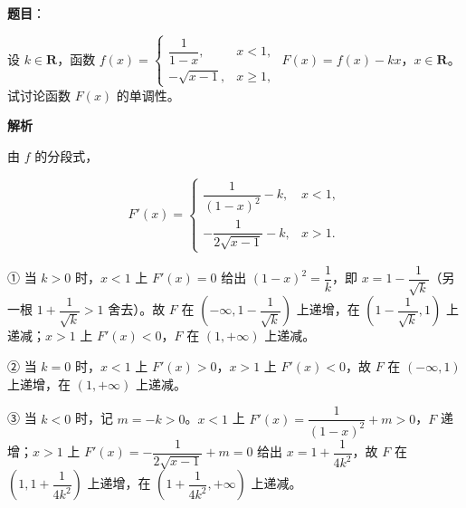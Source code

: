 \begin{answer}

\textbf{题目}：

设 $k\in\mathbf R$，函数 $f(x)=\begin{cases}\dfrac1{1-x},&x<1,\\ -\sqrt{x-1},&x\geqslant1,\end{cases}$ $F(x)=f(x)-kx$，$x\in\mathbf R$。试讨论函数 $F(x)$ 的单调性。

\textbf{解析}

由 $f$ 的分段式，

\nopagebreak[4]
\[F'(x)=\begin{cases}\dfrac1{(1-x)^2}-k,&x<1,\\[6pt] -\dfrac1{2\sqrt{x-1}}-k,&x>1.\end{cases}\]

① 当 $k>0$ 时，$x<1$ 上 $F'(x)=0$ 给出 $(1-x)^2=\dfrac1k$，即 $x=1-\dfrac1{\sqrt k}$（另一根 $1+\dfrac1{\sqrt k}>1$ 舍去）。故 $F$ 在 $\left(-\infty,1-\dfrac1{\sqrt k}\right)$ 上递增，在 $\left(1-\dfrac1{\sqrt k},1\right)$ 上递减；$x>1$ 上 $F'(x)<0$，$F$ 在 $(1,+\infty)$ 上递减。

② 当 $k=0$ 时，$x<1$ 上 $F'(x)>0$，$x>1$ 上 $F'(x)<0$，故 $F$ 在 $(-\infty,1)$ 上递增，在 $(1,+\infty)$ 上递减。

③ 当 $k<0$ 时，记 $m=-k>0$。$x<1$ 上 $F'(x)=\dfrac1{(1-x)^2}+m>0$，$F$ 递增；$x>1$ 上 $F'(x)=-\dfrac1{2\sqrt{x-1}}+m=0$ 给出 $x=1+\dfrac1{4k^2}$，故 $F$ 在 $\left(1,1+\dfrac1{4k^2}\right)$ 上递增，在 $\left(1+\dfrac1{4k^2},+\infty\right)$ 上递减。


\end{answer}
